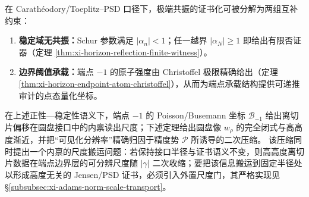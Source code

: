 \begin{corollary}\label{cor:xi-horizon-extreme-resonance-two-stage}
在 Carath\'eodory/Toeplitz--PSD 口径下，极端共振的证书化可被分解为两组互补约束：
\begin{enumerate}
  \item \textbf{稳定域无共振：}Schur 参数满足 \(|\alpha_n|<1\)；任一越界 \(|\alpha_N|\ge 1\) 即给出有限否证器（定理 \ref{thm:xi-horizon-reflection-finite-witness}）。
  \item \textbf{边界阈值承载：}端点 \(-1\) 的原子强度由 Christoffel 极限精确给出（定理 \ref{thm:xi-horizon-endpoint-atom-christoffel}），从而为端点承载结构提供可递推审计的点态量化坐标。
\end{enumerate}
\end{corollary}

在上述正性—稳定性语义下，端点 \(-1\) 的 Poisson/Busemann 坐标 \(\mathcal{B}_{-1}\) 给出离切片偏移在圆盘接口中的内禀读出尺度；下述定理给出圆盘像 \(w_\rho\) 的完全闭式与高高度渐近，并把“可见化分辨率”精确归因于精度势 \(\mathcal{P}\) 所诱导的二次压缩。
该压缩同时提出一个内禀的尺度搬运问题：若保持接口半径与证书语义不变，则高高度离切片数据在端点边界层的可分辨尺度随 \(|\gamma|\) 二次收缩；要把该信息搬运到固定半径处以形成高度无关的 Jensen/PSD 证书，必须引入外置尺度门，其严格实现见 \S\ref{subsubsec:xi-adams-norm-scale-transport}。

